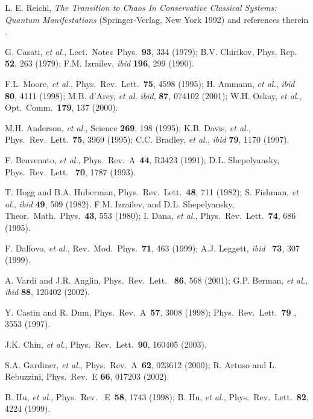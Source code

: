 \documentclass[twocolumn,prl,aps,showpacs]{revtex4}
\begin{document}
\begin{references}
  L. E. Reichl, {\em The Transition to Chaos In Conservative
Classical Systems: Quantum Manifestations\/} (Springer-Verlag, New York
1992) and references therein .

  G. Casati, {\it et al.}, Lect.\ Notes\ Phys.\
{\bf 93}, 334 (1979); B.V. Chirikov, Phys. Rep. {\bf 52}, 263 (1979);
F.M. Izrailev, {\it ibid}  {\bf 196}, 299 (1990).

  F.L. Moore, {\it et al.}, Phys.\ Rev.\ Lett.\ {\bf 75}, 4598 (1995); 
H. Ammann, {\it et al.}, {\it ibid} {\bf 80}, 4111 (1998); M.B. d'Arcy, {\it et al.} {\it ibid}, {\bf 87}, 074102 (2001);
W.H. Oskay, {\it et al.}, Opt.\ Comm.\ {\bf 179}, 137 (2000).

  M.H. Anderson, {\it et al.}, Science {\bf 269}, 198 (1995); 
K.B. Davis, {\it et al.}, Phys.\ Rev.\ Lett.\ {\bf 75}, 3969 (1995); 
C.C. Bradley, {\it et al.}, {\it ibid} {\bf 79}, 1170 (1997).

 F. Benvenuto, {\it et al.}, Phys.\ Rev.\ A\  {\bf 44}, R3423 (1991);
D.L. Shepelyansky, Phys.\ Rev.\ Lett. \  {\bf 70}, 1787 (1993). 

 T. Hogg and B.A. Huberman, Phys.\ Rev.\ Lett.\ {\bf 48}, 711 (1982); S. Fishman, {\it et al.}, 
{\it ibid} {\bf 49}, 509 (1982).
  F.M. Izrailev, and D.L. Shepelyansky, Theor.\ Math.\ Phys.\ {\bf 43}, 553 (1980); I. Dana, {\it et al.},
Phys.\ Rev.\ Lett.\ {\bf 74}, 686 (1995).

 F. Dalfovo, {\it et al.}, Rev.\ Mod.\ Phys.\ {\bf 71}, 463 (1999); A.J. Leggett, {\it ibid} \ {\bf 73}, 307 (1999).

 A. Vardi and J.R. Anglin, Phys.\ Rev.\ Lett. \  {\bf 86}, 568 (2001); G.P. Berman, {\it et al.}, 
{\it ibid} {\bf 88}, 120402 (2002).

 Y. Castin and R. Dum, Phys.\ Rev.\ A\ {\bf 57}, 3008 (1998); Phys.\ Rev.\ Lett.\ {\bf 79%
}, 3553 (1997).

 J.K. Chin, {\it et al.}, Phys.\ Rev.\ Lett.\ {\bf 90}, 160405 (2003).

  S.A. Gardiner, {\it et al.}, Phys.\ Rev.\ A\ {\bf 62}, 023612 (2000); 
R. Artuso and L. Rebuzzini, Phys.\ Rev.\ E {\bf 66}, 017203 (2002).


 B. Hu, {\it et al.},  Phys.\ Rev. \ E\ {\bf 58}, 1743 (1998); B. Hu, {\it et al.}, Phys.\ Rev.\ Lett.\ {\bf 82}, 4224 (1999).



\end{references}
\end{document}
